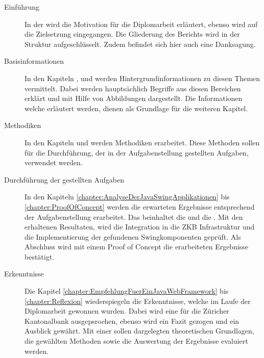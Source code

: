   \begin{description}
    
  \item[Einführung]
  
  In der  wird die Motivation für die Diplomarbeit
  erläutert, ebenso wird auf die Zielsetzung eingegangen. Die Gliederung des
  Berichts wird in der Struktur aufgeschlüsselt. Zudem befindet sich hier auch
  eine Danksagung.
  
  \item[Basisinformationen]
    
  In den Kapiteln 
  , 
   und
   werden
  Hintergrundinformationen zu diesen Themen vermittelt. Dabei werden
  hauptsächlich Begriffe aus diesen Bereichen erklärt und mit Hilfe von
  Abbildungen dargestellt. Die Informationen welche erläutert werden, dienen
  als Grundlage für die weiteren Kapitel.

  \item[Methodiken]
  
  In den Kapiteln 
  und  werden
  Methodiken erarbeitet. Diese Methoden sollen für die Durchführung, der in der
  Aufgabenstellung gestellten Aufgaben, verwendet werden.
  
  \item[Durchführung der gestellten Aufgaben]
  
  In den Kapiteln \ref{chapter:AnalyseDerJavaSwingApplikationen} bis
  \ref{chapter:ProofOfConcept} werden die erwarteten Ergebnisse
  entsprechend der Aufgabenstellung erarbeitet. Das beinhaltet die
   und die
  . Mit den erhaltenen
  Resultaten, wird die Integration in die ZKB Infrastruktur und die
  Implementierung der gefundenen Swingkomponenten geprüft. Als Abschluss wird
  mit einem Proof of Concept die erarbeiteten Ergebnisse bestätigt.
  
  \item[Erkenntnisse]
  
  Die Kapitel \ref{chapter:EmpfehlungFuerEinJavaWebFramework} bis
  \ref{chapter:Reflexion} wiederspiegeln die Erkenntnisse, welche im Laufe
  der Diplomarbeit gewonnen wurden. Dabei wird eine
   für die Züricher
  Kantonalbank ausgepsrochen, ebenso wird ein Fazit gezogen und ein Ausblick
  gewährt. Mit einer  sollen dargelegten
  theoretischen Grundlagen, die gewählten Methoden sowie die Auswertung der
  Ergebnisse evaluiert werden.
  

\end{description}
